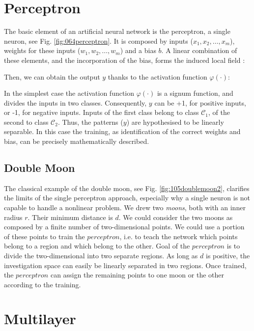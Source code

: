 \section{Perceptron}
\label{sec:perceptron}

The basic element of an artificial neural network is the perceptron, a single
neuron, see Fig.
\ref{fig:064perceptron}.
It is composed by inputs ($x_1, x_2, \ldots, x_m$), weights for these inputs
($w_1, w_2, \ldots, w_m$) and a bias $b$.
A linear combination of these elements, and the incorporation of the bias, 
forms the induced local field \cite{RefWorks:158}: 

Then, we can obtain the output $y$ thanks to the activation function
$\varphi(\cdot)$:


In the simplest case the activation function $\varphi(\cdot)$ is a signum
function, and divides the inputs in two classes.
Consequently, $y$ can be +1, for positive inputs, or -1, for negative inputs. Inputs of the first class
belong to class $\mathscr{C}_1$, of the second to class $\mathscr{C}_2$.
Thus, the patterns ($y$) are hypothesised to be linearly separable.
In this case the training, as identification of the correct weights and bias,
can be precisely mathematically described. \\


\subsection{Double Moon}
\label{subsec:doublemoon}

The classical example of the double moon, see Fig. \ref{fig:105doublemoon2},
clarifies the limits of the single perceptron approach, especially 
why a single neuron is not capable to handle a
nonlinear problem.
We drew two \textit{moons}, both with an inner radius $r$. 
Their minimum distance is $d$.
We could consider the two moons as composed by a finite number of
two-dimensional points.
We could use a portion of these points to train the $perceptron$, i.e. 
to teach the network which points belong to a region and which belong to the
other.
Goal of the $perceptron$ is to divide the two-dimensional
into two separate regions.
As long as $d$ is positive, the investigation space
can easily be linearly separated in two regions.
Once trained, the $perceptron$ can assign the remaining points 
to one moon or the other according to the training.

\section{Multilayer}
\label{sec:multilayer}

